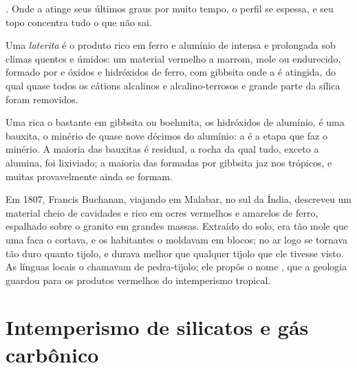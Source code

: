 \emph{.} Onde a  atinge seus últimos graus por muito tempo, o perfil se espessa, e seu topo concentra tudo o que não sai.

\begin{definition}[Laterita]\label{def:b1:weathering-clays:laterite}
Uma \emph{laterita} é o produto rico em ferro e alumínio de  intensa e prolongada sob climas quentes e úmidos: um material vermelho a marrom, mole ou endurecido, formado por  e óxidos e hidróxidos de ferro, com gibbsita onde a  é atingida, do qual quase todos os cátions alcalinos e alcalino-terrosos e grande parte da sílica foram removidos.
\end{definition}

Uma  rica o bastante em gibbsita ou boehmita, os hidróxidos de alumínio, é uma bauxita, o minério de quase nove décimos do alumínio: a  é a etapa que faz o minério. A maioria das bauxitas é residual, a rocha da qual tudo, exceto a alumina, foi lixiviado; a maioria das formadas por gibbsita jaz nos trópicos, e muitas provavelmente ainda se formam.

\begin{history}
Em 1807, Francis Buchanan, viajando em Malabar, no sul da Índia, descreveu um material cheio de cavidades e rico em ocres vermelhos e amarelos de ferro, espalhado sobre o granito em grandes massas. Extraído do solo, era tão mole que uma faca o cortava, e os habitantes o moldavam em blocos; no ar logo se tornava tão duro quanto tijolo, e durava melhor que qualquer tijolo que ele tivesse visto. As línguas locais o chamavam de pedra-tijolo; ele propôs o nome , que a geologia guardou para os produtos vermelhos do intemperismo tropical.
\end{history}

\section{Intemperismo de silicatos e gás carbônico}\label{sec:b1:weathering-clays:co2}

